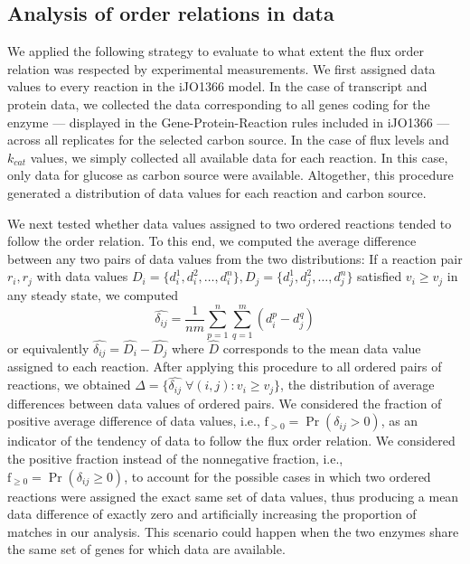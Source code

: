 \documentclass[12pt]{article}
\begin{document}
\subsection{Analysis of order relations in data}
\label{sec:dataAnalysis}
We applied the following strategy to evaluate to what extent the flux order relation was respected by experimental measurements. We first assigned data values to every reaction in the iJO1366 model. In the case of transcript and protein data, we collected the data corresponding to all genes coding for the enzyme --- displayed in the Gene-Protein-Reaction rules included in iJO1366 --- across all replicates for the selected carbon source. In the case of flux levels and $k_{cat}$ values, we simply collected all available data for each reaction. In this case, only data for glucose as carbon source were available. Altogether, this procedure generated a distribution of data values for each reaction and carbon source.

We next tested whether data values assigned to two ordered reactions tended to follow the order relation. To this end, we computed the average difference between any two pairs of data values from the two distributions: If a reaction pair $r_i, r_j$ with data values $D_i = \{d^1_i, d^2_i, \dots, d^n_i\}, D_j = \{d^1_j, d^2_j, \dots, d^n_j\}$ satisfied $v_i \geq v_j$ in any steady state, we computed $$\hat{\delta_{ij}} = \frac{1}{nm} \sum_{p=1}^{n} \sum_{q=1}^{m} (d^p_i - d^q_j)$$ or equivalently $\hat{\delta_{ij}} = \hat{D_i} - \hat{D_j}$ where $\hat{D}$ corresponds to the mean data value assigned to each reaction. After applying this procedure to all ordered pairs of reactions, we obtained $\Delta = \{\hat{\delta_{ij}} \; \forall (i,j) : v_i \geq v_j\}$, the distribution of average differences between data values of ordered pairs. We considered the fraction of positive average difference of data values, i.e., $\mathrm{f}_{>0} = \Pr(\delta_{ij} > 0)$, as an indicator of the tendency of data to follow the flux order relation. We considered the positive fraction instead of the nonnegative fraction, i.e., $\mathrm{f}_{\geq0} = \Pr(\delta_{ij} \geq 0)$, to account for the possible cases in which two ordered reactions were assigned the exact same set of data values, thus producing a mean data difference of exactly zero and artificially increasing the proportion of matches in our analysis. This scenario could happen when the two enzymes share the same set of genes for which data are available.
\end{document}
